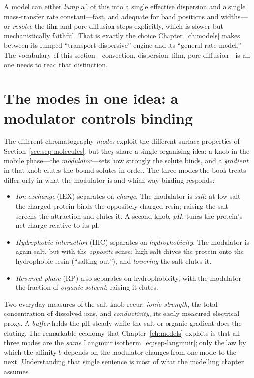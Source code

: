 A model can either \emph{lump} all of this into a single effective dispersion and
a single mass-transfer rate constant---fast, and adequate for band positions and
widths---or \emph{resolve} the film and pore-diffusion steps explicitly, which is
slower but mechanistically faithful. That is exactly the choice
Chapter~\ref{ch:models} makes between its lumped ``transport-dispersive'' engine
and its ``general rate model.'' The vocabulary of this section---convection,
dispersion, film, pore diffusion---is all one needs to read that distinction.

\section{The modes in one idea: a modulator controls binding}
\label{sec:sep-modes}

The different chromatography \emph{modes} exploit the different surface
properties of Section~\ref{sec:sep-molecules}, but they share a single
organising idea: a knob in the mobile phase---the \emph{modulator}---sets how
strongly the solute binds, and a \emph{gradient} in that knob elutes the bound
solutes in order. The three modes the book treats differ only in what the
modulator is and which way binding responds:

\begin{itemize}
  \item \emph{Ion-exchange} (IEX) separates on \emph{charge}. The modulator is
  \emph{salt}: at low salt the charged protein binds the oppositely charged
  resin; raising the salt screens the attraction and elutes it. A second knob,
  \emph{pH}, tunes the protein's net charge relative to its pI.
  \item \emph{Hydrophobic-interaction} (HIC) separates on \emph{hydrophobicity}.
  The modulator is again salt, but with the \emph{opposite} sense: high salt
  drives the protein onto the hydrophobic resin (``salting out''), and
  \emph{lowering} the salt elutes it.
  \item \emph{Reversed-phase} (RP) also separates on hydrophobicity, with the
  modulator the fraction of \emph{organic solvent}; raising it elutes.
\end{itemize}
%
Two everyday measures of the salt knob recur: \emph{ionic strength}, the total
concentration of dissolved ions, and \emph{conductivity}, its easily measured
electrical proxy. A \emph{buffer} holds the pH steady while the salt or organic
gradient does the eluting. The remarkable economy that Chapter~\ref{ch:models}
exploits is that all three modes are the \emph{same} Langmuir
isotherm~\eqref{eq:sep-langmuir}; only the law by which the affinity $b$ depends
on the modulator changes from one mode to the next. Understanding that single
sentence is most of what the modelling chapter assumes.

